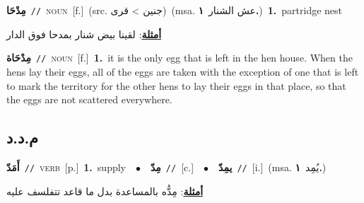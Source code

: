 \documentclass[10pt,a4paper,twoside]{article} %
\begin{document}
\begin{multicols}{2}
{\setlength\topsep{0pt}\textbf{\foreignlanguage{arabic}{مِدْحَا}}\ {\color{gray}\texttt{//}\color{black}}\ \textsc{noun}\ [f.]\ (src. \color{gray}\foreignlanguage{arabic}{جنين > قرى}\color{black})\ \color{gray}(msa. \foreignlanguage{arabic}{عش الشنار}~\foreignlanguage{arabic}{\textbf{١.}})\color{black}\ \textbf{1.}~partridge nest\  \begin{flushright}\color{gray}\foreignlanguage{arabic}{\textbf{\underline{\foreignlanguage{arabic}{أمثلة}}}: لقينا بيض شنار بمدحا فوق الدار}\end{flushright}\color{black}} \vspace{2mm}

{\setlength\topsep{0pt}\textbf{\foreignlanguage{arabic}{مِدْحَاة}}\ {\color{gray}\texttt{//}\color{black}}\ \textsc{noun}\ [f.]\ \textbf{1.}~it is the only egg that is left in the hen house. When the hens lay their eggs, all of the eggs are taken with the exception of one that is left to mark the territory for the other hens to lay their eggs in that place, so that the eggs are not scattered everywhere.\ } \vspace{2mm}

\vspace{-3mm}
\subsection*{\color{blue}\foreignlanguage{arabic}{م.د.د}\color{blue}{}} 

{\setlength\topsep{0pt}\textbf{\foreignlanguage{arabic}{أَمَدّ}}\ {\color{gray}\texttt{//}\color{black}}\ \textsc{verb}\ [p.]\ \textbf{1.}~supply\ \ $\bullet$\ \ \setlength\topsep{0pt}\textbf{\foreignlanguage{arabic}{مِدّ}}\ {\color{gray}\texttt{//}\color{black}}\ [c.]\ \ $\bullet$\ \ \setlength\topsep{0pt}\textbf{\foreignlanguage{arabic}{يمِدّ}}\ {\color{gray}\texttt{//}\color{black}}\ [i.]\ \color{gray}(msa. \foreignlanguage{arabic}{يُمِد}~\foreignlanguage{arabic}{\textbf{١.}})\color{black}\  \begin{flushright}\color{gray}\foreignlanguage{arabic}{\textbf{\underline{\foreignlanguage{arabic}{أمثلة}}}: مِدُّه بالمساعدة بدل ما قاعد تتفلسف عليه}\end{flushright}\color{black}} \vspace{2mm}


\end{multicols}
\end{document}
